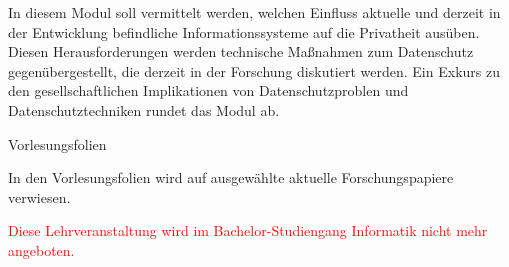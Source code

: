 \begin{course}
\begin{learningoutcomes}
\end{learningoutcomes}

\begin{content}
In diesem Modul soll vermittelt werden, welchen Einfluss aktuelle und derzeit in der Entwicklung befindliche Informationssysteme auf die Privatheit ausüben. Diesen Herausforderungen werden technische Maßnahmen zum Datenschutz gegenübergestellt, die derzeit in der Forschung diskutiert werden. Ein Exkurs zu den gesellschaftlichen Implikationen von Datenschutzproblen und Datenschutztechniken rundet das Modul ab.


\end{content}

\begin{media}Vorlesungsfolien

\end{media}

\begin{literature}In den Vorlesungsfolien wird auf ausgewählte aktuelle Forschungspapiere verwiesen.

\end{literature}

\begin{remarks}\textcolor{red}{Diese Lehrveranstaltung wird im Bachelor-Studiengang Informatik nicht mehr angeboten.}

\end{remarks}

\end{course}